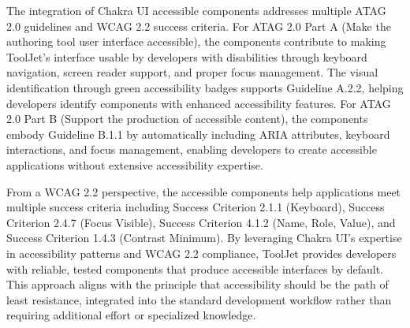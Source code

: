 The integration of Chakra UI accessible components addresses multiple ATAG 2.0 \cite{ATAG20} guidelines and WCAG 2.2 \cite{WCAG22} success criteria. For ATAG 2.0 Part A (Make the authoring tool user interface accessible), the components contribute to making ToolJet's interface usable by developers with disabilities through keyboard navigation, screen reader support, and proper focus management. The visual identification through green accessibility badges supports Guideline A.2.2, helping developers identify components with enhanced accessibility features. For ATAG 2.0 Part B (Support the production of accessible content), the components embody Guideline B.1.1 by automatically including ARIA attributes, keyboard interactions, and focus management, enabling developers to create accessible applications without extensive accessibility expertise.

From a WCAG 2.2 \cite{WCAG22} perspective, the accessible components help applications meet multiple success criteria including Success Criterion 2.1.1 (Keyboard), Success Criterion 2.4.7 (Focus Visible), Success Criterion 4.1.2 (Name, Role, Value), and Success Criterion 1.4.3 (Contrast Minimum). By leveraging Chakra UI's expertise in accessibility patterns and WCAG 2.2 \cite{WCAG22} compliance, ToolJet provides developers with reliable, tested components that produce accessible interfaces by default. This approach aligns with the principle that accessibility should be the path of least resistance, integrated into the standard development workflow rather than requiring additional effort or specialized knowledge.
